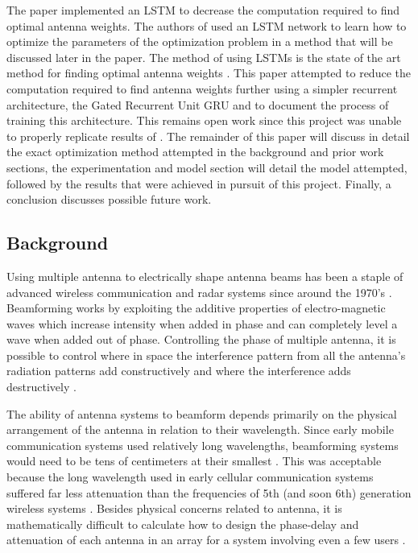 \documentclass[journal]{IEEEtran}
\begin{document}
The paper \cite{LSTM_Net} implemented an LSTM to decrease the computation required to find optimal antenna weights. The authors of \cite{LSTM_Net} used an LSTM network to learn how to optimize the parameters of the optimization problem in a method that will be discussed later in the paper. The method of using LSTMs is the state of the art method for finding optimal antenna weights \cite{Review_DL_BF, LSTM_Net}. This paper attempted to reduce the computation required to find antenna weights further using a simpler recurrent architecture, the Gated Recurrent Unit GRU and to document the process of training this architecture. This remains open work since this project was unable to properly replicate results of \cite{LSTM_Net, Review_DL_BF, NO_inverse_MMSE, Intelligent_mMMIMO}. The remainder of this paper will discuss in detail the exact optimization method attempted in the background and prior work sections, the experimentation and model section will detail the model attempted, followed by the results that were achieved in pursuit of this project. Finally, a conclusion discusses possible future work.

\subsection{Background}

Using multiple antenna to electrically shape antenna beams has been a staple of advanced wireless communication and radar systems since around the 1970's \cite{beamforming}. Beamforming works by exploiting the additive properties of electro-magnetic waves which increase intensity when added in phase and can completely level a wave when added out of phase. Controlling the phase of multiple antenna, it is possible to control where in space the interference pattern from all the antenna's radiation patterns add constructively and where the interference adds destructively \cite{beamforming}. 

The ability of antenna systems to beamform depends primarily on the physical arrangement of the antenna in relation to their wavelength. Since early mobile communication systems used relatively long wavelengths, beamforming systems would need to be tens of centimeters at their smallest \cite{beamforming}. This was acceptable because the long wavelength used in early cellular communication systems suffered far less attenuation than the frequencies of 5th (and soon 6th) generation wireless systems \cite{next_gen_wireless}. Besides physical concerns related to antenna, it is mathematically difficult to calculate how to design the phase-delay and attenuation of each antenna in an array for a system involving even a few users \cite{next_gen_wireless}. 
\end{document}
